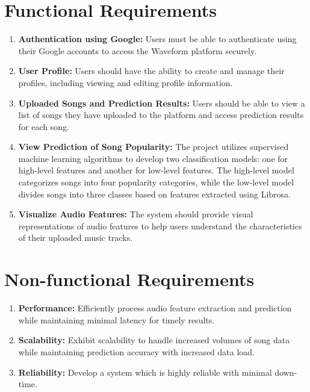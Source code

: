 \documentclass[11pt]{report}
\begin{document}
\newpage

\section{Functional Requirements}
\begin{enumerate}
  \item \textbf{Authentication using Google:} Users must be able to authenticate using their Google accounts to access the Waveform platform securely.
    
  \item \textbf{User Profile:} Users should have the ability to create and manage their profiles, including viewing and editing profile information.
    
  \item \textbf{Uploaded Songs and Prediction Results:} Users should be able to view a list of songs they have uploaded to the platform and access prediction results for each song.
    
  \item \textbf{ View Prediction of Song Popularity:} The project utilizes supervised machine learning algorithms to develop two classification models: one for high-level features and another for low-level features. The high-level model categorizes songs into four popularity categories, while the low-level model divides songs into three classes based on features extracted using Librosa.

  \item \textbf{Visualize Audio Features:} The system should provide visual representations of audio features to help users understand the characteristics of their uploaded music tracks.
\end{enumerate}



\newpage
\section{Non-functional Requirements} 
\begin{enumerate}
  \item \textbf{Performance:} Efficiently process audio feature extraction and prediction while maintaining minimal latency for timely results.
    
  \item \textbf{Scalability:} Exhibit scalability to handle increased volumes of song data while maintaining prediction accuracy with increased data load.

  \item \textbf{Reliability:} Develop a system which is highly reliable with minimal down-time.
\end{enumerate}
\end{document}

